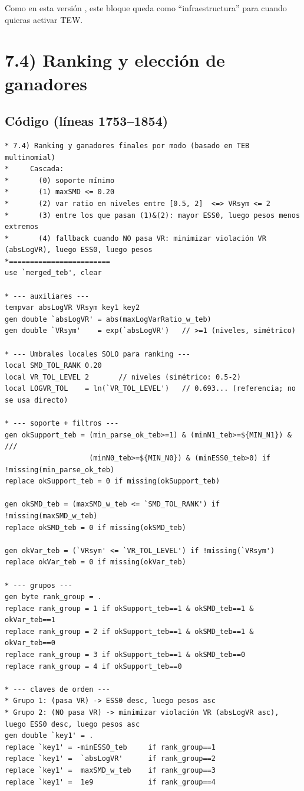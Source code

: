\documentclass[12pt]{article}
\newcommand{\ttt}[1]{\texttt{\detokenize{#1}}}
\begin{document}
Como en esta versión \ttt{RUN_TEW=0}, este bloque queda como ``infraestructura'' para cuando quieras activar TEW.


\section{7.4) Ranking y elección de ganadores}\label{sec:ranking}
\subsection*{Código (líneas 1753--1854)}
\begin{lstlisting}
* 7.4) Ranking y ganadores finales por modo (basado en TEB multinomial)
*     Cascada:
*       (0) soporte mínimo
*       (1) maxSMD <= 0.20
*       (2) var ratio en niveles entre [0.5, 2]  <=> VRsym <= 2
*       (3) entre los que pasan (1)&(2): mayor ESS0, luego pesos menos extremos
*       (4) fallback cuando NO pasa VR: minimizar violación VR (absLogVR), luego ESS0, luego pesos
*========================
use `merged_teb', clear

* --- auxiliares ---
tempvar absLogVR VRsym key1 key2
gen double `absLogVR' = abs(maxLogVarRatio_w_teb)
gen double `VRsym'    = exp(`absLogVR')   // >=1 (niveles, simétrico)

* --- Umbrales locales SOLO para ranking ---
local SMD_TOL_RANK 0.20
local VR_TOL_LEVEL 2       // niveles (simétrico: 0.5-2)
local LOGVR_TOL    = ln(`VR_TOL_LEVEL')   // 0.693... (referencia; no se usa directo)

* --- soporte + filtros ---
gen okSupport_teb = (min_parse_ok_teb>=1) & (minN1_teb>=${MIN_N1}) & ///
                    (minN0_teb>=${MIN_N0}) & (minESS0_teb>0) if !missing(min_parse_ok_teb)
replace okSupport_teb = 0 if missing(okSupport_teb)

gen okSMD_teb = (maxSMD_w_teb <= `SMD_TOL_RANK') if !missing(maxSMD_w_teb)
replace okSMD_teb = 0 if missing(okSMD_teb)

gen okVar_teb = (`VRsym' <= `VR_TOL_LEVEL') if !missing(`VRsym')
replace okVar_teb = 0 if missing(okVar_teb)

* --- grupos ---
gen byte rank_group = .
replace rank_group = 1 if okSupport_teb==1 & okSMD_teb==1 & okVar_teb==1
replace rank_group = 2 if okSupport_teb==1 & okSMD_teb==1 & okVar_teb==0
replace rank_group = 3 if okSupport_teb==1 & okSMD_teb==0
replace rank_group = 4 if okSupport_teb==0

* --- claves de orden ---
* Grupo 1: (pasa VR) -> ESS0 desc, luego pesos asc
* Grupo 2: (NO pasa VR) -> minimizar violación VR (absLogVR asc), luego ESS0 desc, luego pesos asc
gen double `key1' = .
replace `key1' = -minESS0_teb     if rank_group==1
replace `key1' =  `absLogVR'      if rank_group==2
replace `key1' =  maxSMD_w_teb    if rank_group==3
replace `key1' =  1e9             if rank_group==4


\end{lstlisting}
\end{document}

